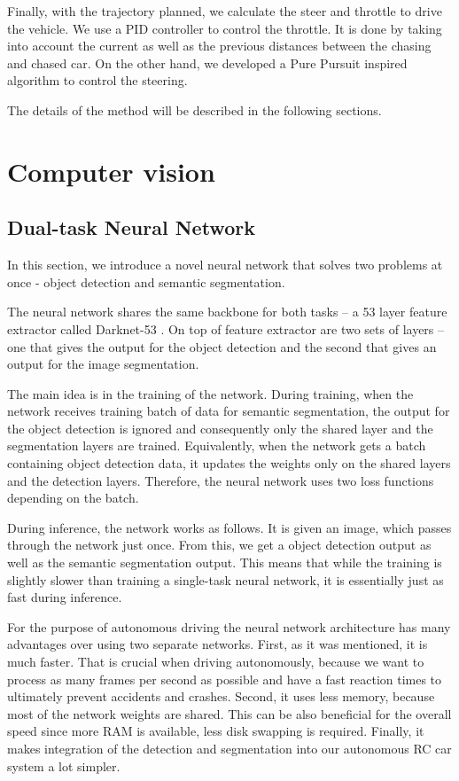 Finally, with the trajectory planned, we calculate the steer and throttle to drive the vehicle. We use a PID controller \cite{PID_orig} to control the throttle. It is done by taking into account the current as well as the previous distances between the chasing and chased car. On the other hand, we developed a Pure Pursuit \cite{pure_pursuit_orig} inspired algorithm to control the steering. \par

The details of the method will be described in the following sections.

\section{Computer vision}
\subsection{Dual-task Neural Network}
In this section, we introduce a novel neural network that solves two problems at once - object detection and semantic segmentation. \par

The neural network shares the same backbone for both tasks -- a 53 layer feature extractor called Darknet-53 \cite{YOLOv3}. On top of feature extractor are two sets of layers -- one that gives the output for the object detection and the second that gives an output for the image segmentation. \par

The main idea is in the training of the network. During training, when the network receives training batch of data for semantic segmentation, the output for the object detection is ignored and consequently only the shared layer and the segmentation layers are trained. Equivalently, when the network gets a batch containing object detection data, it updates the weights only on the shared layers and the detection layers. Therefore, the neural network uses two loss functions depending on the batch. \par

During inference, the network works as follows. It is given an image, which passes through the network just once. From this, we get a object detection output as well as the semantic segmentation output. This means that while the training is slightly slower than training a single-task neural network, it is essentially just as fast during inference. \par

For the purpose of autonomous driving the neural network architecture has many advantages over using two separate networks. First, as it was mentioned, it is much faster. That is crucial when driving autonomously, because we want to process as many frames per second as possible and have a fast reaction times to ultimately prevent accidents and crashes. Second, it uses less memory, because most of the network weights are shared. This can be also beneficial for the overall speed since more RAM is available, less disk swapping is required. Finally, it makes integration of the detection and segmentation into our autonomous RC car system a lot simpler.




